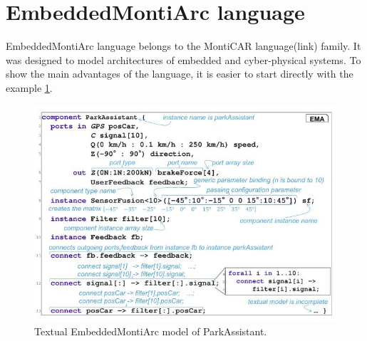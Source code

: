 \section{EmbeddedMontiArc language} \label{sec:ema}
EmbeddedMontiArc language belongs to the MontiCAR language(link) family. It was designed to model architectures of embedded and cyber-physical systems. To show the main advantages of the language, it is easier to start directly with the example \ref{fig:embdmontiarc}.
\begin{figure}[h!]
    \centering
    \includegraphics[width=\linewidth]{src/pic/embdmontiarc}
    \caption{Textual EmbeddedMontiArc model of ParkAssistant.}
    \label{fig:embdmontiarc}
\end{figure} \\
